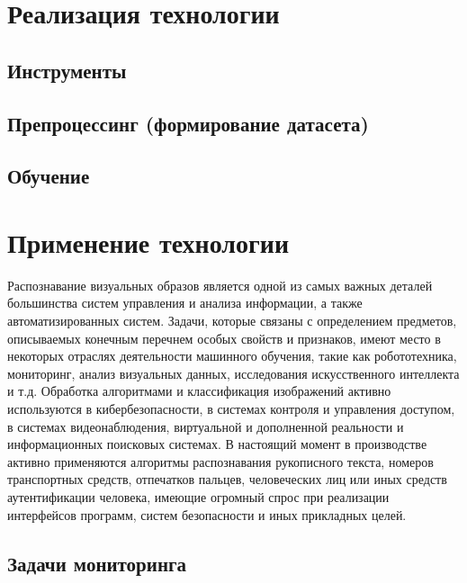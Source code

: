 \documentclass[bachelor, och, coursework]{SCWorks}
\begin{document}

\section{Реализация технологии}

    \subsection{Инструменты}
            
    \subsection{Препроцессинг (формирование датасета)}
            
    \subsection{Обучение}
        

\section{Применение технологии}

    Распознавание визуальных образов является одной из самых важных
    деталей большинства систем управления и анализа информации, а также
    автоматизированных систем. Задачи, которые связаны с определением предметов,
    описываемых конечным перечнем особых свойств и признаков, имеют место в некоторых 
    отраслях деятельности машинного обучения, такие как робототехника, мониторинг, анализ
    визуальных данных, исследования искусственного интеллекта и т.д. Обработка алгоритмами и
    классификация изображений активно используются в кибербезопасности, в системах контроля и
    управления доступом, в системах видеонаблюдения, виртуальной и дополненной
    реальности и информационных поисковых системах. В настоящий момент в
    производстве активно применяются алгоритмы распознавания рукописного текста,
    номеров транспортных средств, отпечатков пальцев, человеческих лиц или иных средств аутентификации человека, имеющие огромный спрос при реализации интерфейсов программ, систем безопасности и иных прикладных целей.

    \subsection{Задачи мониторинга}
        
\end{document}

